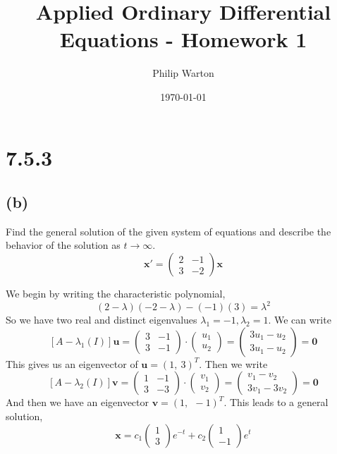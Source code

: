 \documentclass{article}
\theoremstyle{definition}
\begin{document}
\title{Applied Ordinary Differential Equations - Homework 1}
\author{Philip Warton}
\date{\today}
\maketitle
\section*{7.5.3}
    \subsection*{(b)}
        \begin{mdframed}[]
            Find the general solution of the given system of equations 
            and describe the behavior of the solution as $t \rightarrow \infty$.
            \[
                \bm x' = \begin{pmatrix}
                    2 & -1 \\ 3 & -2
                \end{pmatrix}  \bm x
            \]
        \end{mdframed}
        We begin by writing the characteristic polynomial,
        \[
            (2 - \lambda)(-2 - \lambda) - (-1)(3) = \lambda^2
        \]
        So we have two real and distinct eigenvalues $\lambda_1 = -1, \lambda_2 = 1$.
        We can write 
        \[
            [A - \lambda_1(I)]\bm u = \begin{pmatrix}
                3 & -1 \\ 3 & -1
            \end{pmatrix} \cdot \begin{pmatrix}
                u_1 \\ u_2
            \end{pmatrix} = \begin{pmatrix}
                3u_1 -u_2 \\ 3u_1 - u_2
            \end{pmatrix} = \bm 0
        \]
        This gives us an eigenvector of $\bm u = (1,\ 3)^T$. Then we write 
        \[
            [A - \lambda_2(I)]\bm v = \begin{pmatrix}
                1 & -1 \\ 3 & -3
            \end{pmatrix} \cdot \begin{pmatrix}
                v_1 \\ v_2
            \end{pmatrix} = \begin{pmatrix}
                v_1 - v_2\\3v_1 - 3v_2
            \end{pmatrix} = \bm 0
        \]
        And then we have an eigenvector $\bm v = (1, \ \ -1)^T$.
        This leads to a general solution,
        \[
            \bm x = c_1 \begin{pmatrix}
                1 \\ 3
            \end{pmatrix}e^{-t} + c_2 \begin{pmatrix}
                1 \\ -1
            \end{pmatrix}e^{t}
        \]
\end{document}
